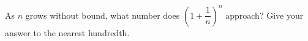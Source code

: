 As $n$ grows without bound, what number does $\left(1+\dfrac{1}{n}\right)^n$ approach? Give your answer to the nearest hundredth.
